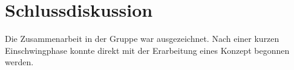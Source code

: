 \section{Schlussdiskussion}
Die Zusammenarbeit in der Gruppe war ausgezeichnet. Nach einer kurzen Einschwingphase konnte direkt mit der Erarbeitung eines Konzept begonnen werden.